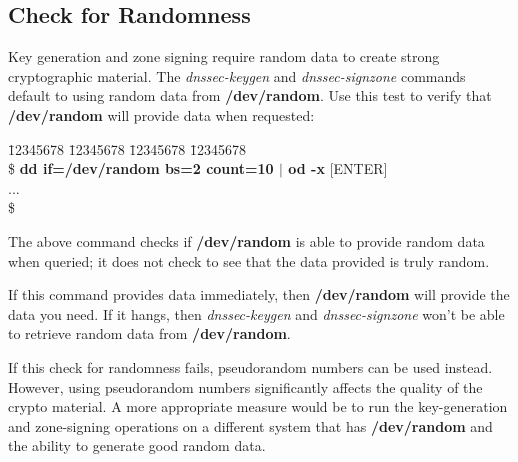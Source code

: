 \documentclass[12pt]{article}
\newcommand{\cmd}[1]{{\em #1}}
\newcommand{\path}[1]{{\bf #1}}
\begin{document}
\subsection{Check for Randomness}
\label{check-random}

Key generation and zone signing require random data to create strong
cryptographic material.  The \cmd{dnssec-keygen} and \cmd{dnssec-signzone}
commands default to using random data from \path{/dev/random}.  Use this test
to verify that \path{/dev/random} will provide data when requested:

\begin{tabbing}
\hspace{0.5in} \= 12345678 \= 12345678 \= 12345678 \= 12345678 \kill \\
\hspace{0.5in}\$ {\bf dd if=/dev/random bs=2 count=10 $|$ od -x} $[$ENTER$]$ \\
\hspace{0.5in}...\\
\hspace{0.5in}\$ \\
\end{tabbing}

The above command checks if \path{/dev/random} is able to provide random data
when queried; it does not check to see that the data provided is truly random.

If this command provides data immediately, then \path{/dev/random} will
provide the data you need.  If it hangs, then \cmd{dnssec-keygen} and
\cmd{dnssec-signzone} won't be able to retrieve random data from
\path{/dev/random}.


If this check for randomness fails, pseudorandom numbers can be used instead.
However, using pseudorandom numbers significantly affects the quality
of the crypto material.  A more appropriate measure would be to run the
key-generation and zone-signing operations on a different system that has
\path{/dev/random} and the ability to generate good random data.

\end{document}

